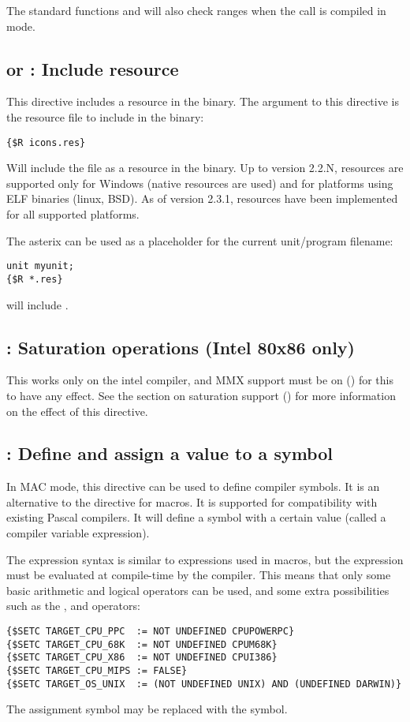 \begin{remark}The standard functions  and  will also check ranges
when the call is compiled in  mode.
\end{remark}

\subsection{ or  : Include resource}
This directive includes a resource in the binary. The argument to this directive is the resource
file to include in the binary:
\begin{verbatim}
{$R icons.res}
\end{verbatim}
Will include the file  as a resource in the binary. Up to
version 2.2.N, resources are supported only for Windows (native resources are used) 
and for platforms using ELF binaries (linux, BSD). As of version 2.3.1,
resources have been implemented for all supported platforms.

The asterix can be used as a placeholder for the current unit/program filename:
\begin{verbatim}
unit myunit;
{$R *.res}
\end{verbatim}
will include .

\subsection{ : Saturation operations (Intel 80x86 only)}

This works only on the intel compiler, and MMX support must be on
() for this to have any effect. See the section on
saturation support () for more information
on the effect of this directive.

\subsection{ : Define and assign a value to a symbol}

In MAC mode, this directive can be used to define compiler symbols. It is
an alternative to the  directive for macros. It is supported for 
compatibility with existing \macos Pascal compilers. It will define a symbol
with a certain value (called a compiler variable expression). 

The expression syntax is similar to expressions used in macros, but the
expression must be evaluated at compile-time by the compiler. This means
that only some basic arithmetic and logical operators can be used,
and some extra possibilities such as the , and 
operators:
\begin{verbatim}
{$SETC TARGET_CPU_PPC  := NOT UNDEFINED CPUPOWERPC}
{$SETC TARGET_CPU_68K  := NOT UNDEFINED CPUM68K}
{$SETC TARGET_CPU_X86  := NOT UNDEFINED CPUI386}
{$SETC TARGET_CPU_MIPS := FALSE}
{$SETC TARGET_OS_UNIX  := (NOT UNDEFINED UNIX) AND (UNDEFINED DARWIN)}
\end{verbatim}
The \var{:=} assignment symbol may be replaced with the \var{=} symbol.

